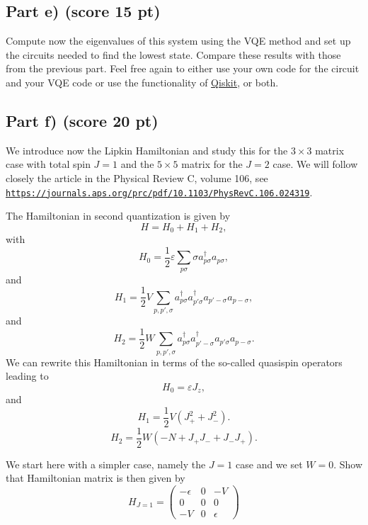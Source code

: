 \documentclass[%
oneside,                 %
final,                   %
10pt]{article}
\begin{document}
\subsection*{Part e) (score 15 pt)}

Compute now the eigenvalues of this system using the VQE method and
set up the circuits needed to find the lowest state. Compare these
results with those from the previous part. Feel free again to either
use your own code for the circuit and your VQE code or use the
functionality of \href{{https://qiskit.org/}}{Qiskit}, or both.

\subsection*{Part f) (score 20 pt)}

We introduce now the Lipkin Hamiltonian and study this for the
$3\times 3$ matrix case with total spin $J=1$ and the $5\times 5$
matrix for the $J=2$ case.
We will follow closely the article in the Physical Review C, volume 106, see \href{{https://journals.aps.org/prc/pdf/10.1103/PhysRevC.106.024319}}{\nolinkurl{https://journals.aps.org/prc/pdf/10.1103/PhysRevC.106.024319}}.

The Hamiltonian in second quantization is given by
\[
H = H_0 + H_1 +H_2,
\]
with 
\[
H_0 = \frac{1}{2} \varepsilon \sum_{p\sigma}\sigma a_{p\sigma}^{\dagger}a_{p\sigma},
\]
and
\[
H_1 = \frac{1}{2} V \sum_{p,p',\sigma} a_{p\sigma}^\dagger a_{p'\sigma}^\dagger a_{p'-\sigma} a_{p-\sigma},
\]
and
\[
H_{2} = \frac{1}{2} W \sum_{p,p',\sigma}a_{p\sigma}^\dagger a_{p'-\sigma}^\dagger a_{p'\sigma}a_{p-\sigma}.
\]
We can rewrite this Hamiltonian in terms of the so-called quasispin operators leading to
\begin{equation}
H_0 = \varepsilon J_z,
\end{equation}
and
\begin{equation}
H_1 = \frac{1}{2} V \left( J_+^2 + J_-^2 \right).
\end{equation}
\begin{equation}
H_2 = \frac{1}{2} W \left( -N + J_+ J_- + J_- J_+ \right).
\end{equation}

We start here with a simpler case, namely the $J=1$ case and we set $W=0$. Show that Hamiltonian matrix is then given by
\begin{equation}
H_{J = 1} =
\begin{pmatrix}-\epsilon & 0 & -V\\
 0&0&0\\
 -V&0&\epsilon
\end{pmatrix}
\end{equation}
\end{document}
